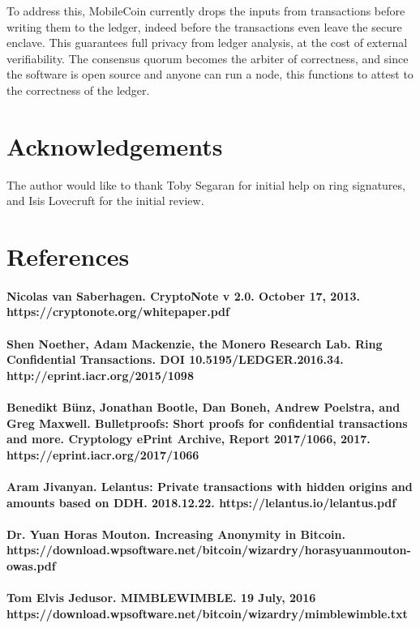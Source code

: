 \documentclass{article}
\begin{document}
To address this, MobileCoin currently drops the inputs from transactions before writing them to the ledger, indeed before the transactions even leave the secure enclave.  This guarantees full privacy from ledger analysis, at the cost of external verifiability.  The consensus quorum becomes the arbiter of correctness, and since the software is open source and anyone can run a node, this functions to attest to the correctness of the ledger.



\section{Acknowledgements}

The author would like to thank Toby Segaran for initial help on ring signatures, and Isis Lovecruft for the initial review.



\section{References}

\paragraph{Nicolas van Saberhagen. CryptoNote v 2.0. October 17, 2013. https://cryptonote.org/whitepaper.pdf}

\paragraph{Shen Noether, Adam Mackenzie, the Monero Research Lab. Ring Confidential Transactions. DOI 10.5195/LEDGER.2016.34. http://eprint.iacr.org/2015/1098}

\paragraph{Benedikt Bünz, Jonathan Bootle, Dan Boneh, Andrew Poelstra, and Greg Maxwell. Bulletproofs: Short proofs for confidential transactions and more. Cryptology ePrint Archive, Report 2017/1066, 2017. https://eprint.iacr.org/2017/1066}

\paragraph{Aram Jivanyan. Lelantus: Private transactions with hidden origins and amounts based on DDH. 2018.12.22. https://lelantus.io/lelantus.pdf}

\paragraph{Dr. Yuan Horas Mouton. Increasing Anonymity in Bitcoin. https://download.wpsoftware.net/bitcoin/wizardry/horasyuanmouton-owas.pdf}

\paragraph{Tom Elvis Jedusor. MIMBLEWIMBLE. 19 July, 2016 https://download.wpsoftware.net/bitcoin/wizardry/mimblewimble.txt}
\end{document}
